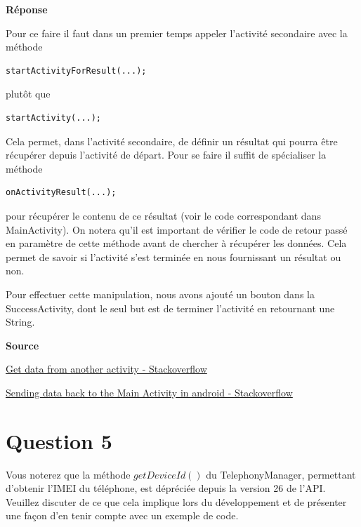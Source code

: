 \documentclass[francais,12pt]{article}
\begin{document}
		 {\color[rgb]{0,0.5,0.23}\textbf{Réponse}}
		 
		 Pour ce faire il faut dans un premier temps appeler l'activité secondaire avec la méthode 
		 
		 \begin{lstlisting}[style=javaCode]
		 startActivityForResult(...);
		 \end{lstlisting}
		 
		 plutôt que 
		 		 
		 \begin{lstlisting}[style=javaCode]
		 startActivity(...);
		 \end{lstlisting}
		 
		 Cela permet, dans l'activité secondaire, de définir un résultat qui pourra être récupérer depuis l'activité de départ. Pour se faire il suffit de spécialiser la méthode 
		 
		\begin{lstlisting}[style=javaCode]
		 onActivityResult(...);
		 \end{lstlisting}
		 
		 pour récupérer le contenu de ce résultat (voir le code correspondant dans MainActivity). On notera qu'il est important de vérifier le code de retour passé en paramètre de cette méthode avant de chercher à récupérer les données. Cela permet de savoir si l'activité s'est terminée en nous fournissant un résultat ou non.\newline
		 
		 Pour effectuer cette manipulation, nous avons ajouté un bouton dans la SuccessActivity, dont le seul but est de terminer l'activité en retournant une String.
		 
		\textbf{Source}

        \href{https://stackoverflow.com/questions/13178056/get-data-from-another-activity}{Get data from another activity - Stackoverflow}
    
        \href{https://stackoverflow.com/questions/920306/sending-data-back-to-the-main-activity-in-android}{Sending data back to the Main Activity in android - Stackoverflow}
        
	\section*{Question 5}
		Vous noterez que la méthode $getDeviceId()$ du TelephonyManager, permettant d'obtenir l'IMEI du téléphone, est dépréciée depuis la version 26 de l'API. Veuillez discuter de ce que cela implique lors du développement et de présenter une façon d'en tenir compte avec un exemple de code. 
		
\end{document}
